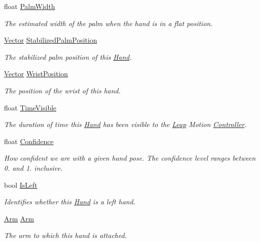 \begin{DoxyCompactItemize}
float \mbox{\hyperlink{class_leap_1_1_hand_a1a8e00fae9b278de950b48ece3a2097e}{Palm\+Width}}
\begin{DoxyCompactList}\small\item\em The estimated width of the palm when the hand is in a flat position. \end{DoxyCompactList}\item 
\mbox{\hyperlink{struct_leap_1_1_vector}{Vector}} \mbox{\hyperlink{class_leap_1_1_hand_a79b70c3a70eb0b81f56a73ed4035d545}{Stabilized\+Palm\+Position}}
\begin{DoxyCompactList}\small\item\em The stabilized palm position of this \mbox{\hyperlink{class_leap_1_1_hand}{Hand}}. \end{DoxyCompactList}\item 
\mbox{\hyperlink{struct_leap_1_1_vector}{Vector}} \mbox{\hyperlink{class_leap_1_1_hand_a18030f2fe8236bfcfc9be404eb3c9a57}{Wrist\+Position}}
\begin{DoxyCompactList}\small\item\em The position of the wrist of this hand. \end{DoxyCompactList}\item 
float \mbox{\hyperlink{class_leap_1_1_hand_a880d68f1c1677ed4e8a8a3fe17370d1f}{Time\+Visible}}
\begin{DoxyCompactList}\small\item\em The duration of time this \mbox{\hyperlink{class_leap_1_1_hand}{Hand}} has been visible to the \mbox{\hyperlink{namespace_leap}{Leap}} Motion \mbox{\hyperlink{class_leap_1_1_controller}{Controller}}. \end{DoxyCompactList}\item 
float \mbox{\hyperlink{class_leap_1_1_hand_ac7f4665971a0f1d192d9dcc0f7ef1d01}{Confidence}}
\begin{DoxyCompactList}\small\item\em How confident we are with a given hand pose. The confidence level ranges between 0. and 1. inclusive. \end{DoxyCompactList}\item 
bool \mbox{\hyperlink{class_leap_1_1_hand_a783d6adaec7c3f3422e70bba4480b39d}{Is\+Left}}
\begin{DoxyCompactList}\small\item\em Identifies whether this \mbox{\hyperlink{class_leap_1_1_hand}{Hand}} is a left hand. \end{DoxyCompactList}\item 
\mbox{\hyperlink{class_leap_1_1_arm}{Arm}} \mbox{\hyperlink{class_leap_1_1_hand_a929a9aae640b9e8de5b544d7faacd04a}{Arm}}
\begin{DoxyCompactList}\small\item\em The arm to which this hand is attached. \end{DoxyCompactList}\end{DoxyCompactItemize}
